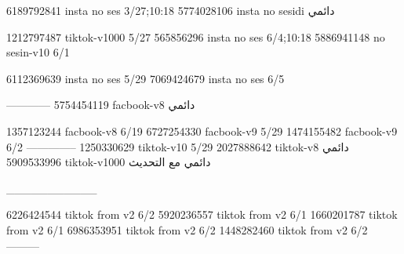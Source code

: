 
6189792841 insta no ses
3/27;10:18
5774028106 insta no sesidi
دائمي

1212797487 tiktok-v1000
5/27
565856296 insta no ses
6/4;10:18
5886941148 no sesin-v10
6/1

6112369639 insta no ses
5/29
7069424679 insta no ses
6/5

------------
5754454119 facbook-v8
دائمي

1357123244 facbook-v8
6/19
6727254330 facbook-v9
5/29
1474155482 facbook-v9
6/2
--------------
1250330629 tiktok-v10
5/29
2027888642 tiktok-v8
دائمي
5909533996 tiktok-v1000
دائمي مع التحديث

___________

6226424544 tiktok from v2
6/2
5920236557 tiktok from v2
6/1
1660201787 tiktok from v2
6/1
6986353951 tiktok from v2
6/2
1448282460 tiktok from v2
6/2
---------
